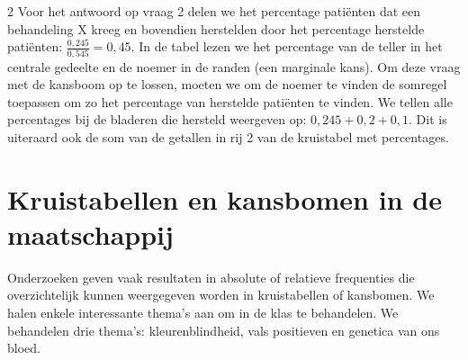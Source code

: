 \begin{multicols} {2}
Voor het antwoord op vraag 2 delen we het percentage patiënten dat een behandeling X kreeg en bovendien herstelden door het percentage herstelde patiënten: $\frac{0,245}{0,545}=0,45$. In de tabel lezen we het percentage van de teller in het centrale gedeelte en de noemer in de randen (een marginale kans). Om deze vraag met de kansboom op te lossen, moeten we om de noemer te vinden de somregel toepassen om zo het percentage van herstelde patiënten te vinden. We tellen alle percentages bij de bladeren die hersteld weergeven op: $0,245+0,2+0,1$. Dit is uiteraard ook de som van de getallen in rij 2 van de kruistabel met percentages. 

\section{Kruistabellen en kansbomen in de maatschappij}
Onderzoeken geven vaak resultaten in absolute of relatieve frequenties die overzichtelijk kunnen weergegeven worden in kruistabellen of kansbomen. We halen enkele interessante thema’s aan om in de klas te behandelen. We behandelen drie thema’s: kleurenblindheid, vals positieven en genetica van ons bloed.

\end{multicols}
